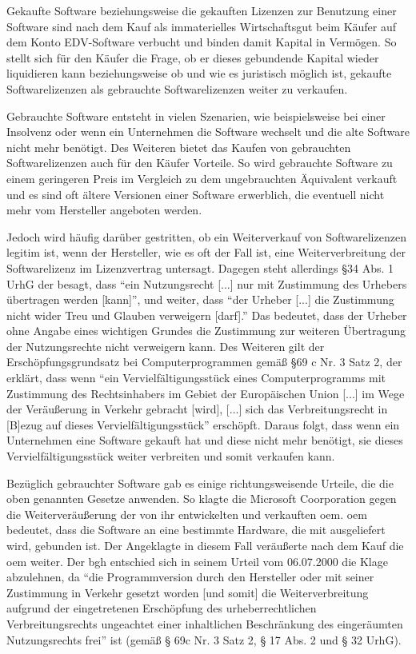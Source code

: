 Gekaufte Software beziehungsweise die gekauften Lizenzen zur Benutzung einer Software sind nach dem Kauf als immaterielles Wirtschaftsgut beim Käufer
auf dem Konto EDV-Software verbucht und binden damit Kapital in Vermögen. So stellt sich für den Käufer die Frage, ob er dieses gebundende Kapital wieder liquidieren kann
beziehungsweise ob und wie es juristisch möglich ist, gekaufte Softwarelizenzen als gebrauchte Softwarelizenzen weiter zu verkaufen. 

Gebrauchte Software entsteht in vielen Szenarien, wie beispielsweise bei einer Insolvenz oder wenn ein Unternehmen die Software wechselt und die alte Software nicht mehr benötigt.
Des Weiteren bietet das Kaufen von gebrauchten Softwarelizenzen auch für den Käufer Vorteile. So wird gebrauchte Software zu einem geringeren Preis im Vergleich
zu dem ungebrauchten Äquivalent verkauft und es sind oft ältere Versionen einer Software erwerblich, die eventuell nicht mehr vom Hersteller angeboten werden. 

Jedoch wird häufig darüber gestritten, ob ein Weiterverkauf von Softwarelizenzen legitim ist, wenn der Hersteller, wie es oft der Fall ist, eine Weiterverbreitung der
Softwarelizenz im Lizenzvertrag untersagt. Dagegen steht allerdings §34 Abs. 1 UrhG der besagt, dass “ein Nutzungsrecht [...] nur mit Zustimmung des Urhebers übertragen werden [kann]”,
und weiter, dass “der Urheber [...] die Zustimmung nicht wider Treu und Glauben verweigern [darf].” Das bedeutet, dass der Urheber ohne Angabe eines wichtigen
Grundes die Zustimmung zur weiteren Übertragung der Nutzungsrechte nicht verweigern kann. Des Weiteren gilt der Erschöpfungsgrundsatz bei Computerprogrammen gemäß §69 c Nr. 3 Satz 2,
der erklärt, dass wenn “ein Vervielfältigungsstück eines Computerprogramms mit Zustimmung des Rechtsinhabers im Gebiet der Europäischen Union [...] im Wege der Veräußerung in Verkehr
gebracht [wird], [...] sich das Verbreitungsrecht in [B]ezug auf dieses Vervielfältigungsstück” erschöpft. Daraus folgt, dass wenn ein Unternehmen eine Software gekauft hat und diese
nicht mehr benötigt, sie dieses Vervielfältigungsstück weiter verbreiten und somit verkaufen kann. 

Bezüglich gebrauchter Software gab es einige richtungsweisende Urteile, die die oben genannten Gesetze anwenden. So klagte die Microsoft Coorporation
gegen die Weiterveräußerung der von ihr entwickelten und verkauften \gls{oem}. \gls{oem} bedeutet,
dass die Software an eine bestimmte Hardware, die mit ausgeliefert wird, gebunden ist. Der Angeklagte in diesem Fall veräußerte nach dem Kauf die \gls{oem} weiter.
Der \gls{bgh} entschied sich in seinem Urteil vom 06.07.2000 die Klage abzulehnen, da “die Programmversion durch den Hersteller oder mit seiner Zustimmung in Verkehr gesetzt worden
[und somit] die Weiterverbreitung aufgrund der eingetretenen Erschöpfung des urheberrechtlichen Verbreitungsrechts ungeachtet einer inhaltlichen Beschränkung des eingeräumten
Nutzungsrechts frei” ist (gemäß § 69c Nr. 3 Satz 2, § 17 Abs. 2 und § 32 UrhG).

